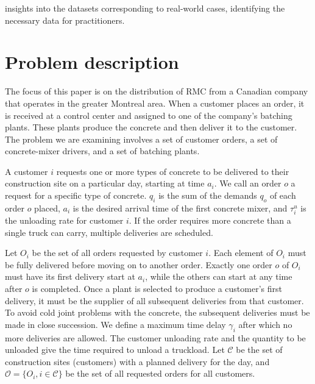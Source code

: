 \documentclass{article}
\begin{document}
insights into the datasets corresponding to real-world cases, identifying the necessary data for practitioners. 

\section{Problem description}
\label{desc_form}
The focus of this paper is on the distribution of RMC from a Canadian company that operates in the greater Montreal area. When a customer places an order, it is received at a control center and assigned to one of the company's batching plants. These plants produce the concrete and then deliver it to the customer. The problem we are examining involves a set of customer orders, a set of concrete-mixer drivers, and a set of batching plants.


A customer $i$ requests one or more types of concrete to be delivered to their  construction site on a particular day, starting at time $a_i$.  We call an order $o$ a request for a specific type of concrete.  $q_i$ is the sum of the demands $q_o$ of each order $o$ placed, $a_i$ is the desired arrival time of the first concrete mixer, and $\tau^u_i$ is the unloading rate for customer $i$. If the order requires more concrete than a single truck can carry, multiple deliveries are scheduled.

Let $O_i$ be the set of all orders requested by customer $i$. Each element of $O_i$ must be fully delivered before moving on to another order. Exactly one order $o$ of $O_i$ must have its first delivery start at $a_i$, while the others can start at any time after $o$ is completed. Once a plant is selected to produce a customer's first delivery, it must be the supplier of all subsequent deliveries from that customer. To avoid cold joint problems with the concrete, the subsequent deliveries must be made in close succession. We define a maximum time delay $\gamma_i$ after which no more deliveries are allowed. The customer unloading rate and the quantity to be unloaded give the time required to unload a truckload. Let $\mathcal{C}$ be the set of construction sites (customers) with a planned delivery for the day, and $\mathcal{O}=\{{O_i, i \in \mathcal{C}}\}$ be the set of all requested orders for all customers. 

\end{document}

